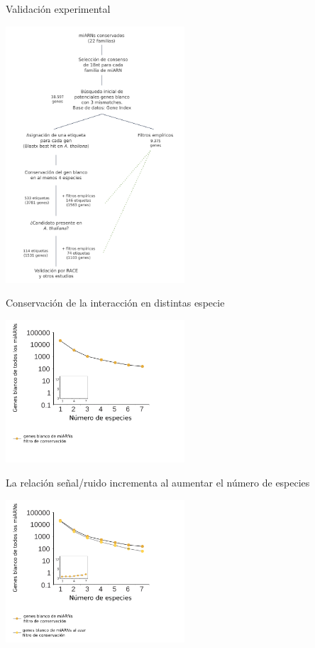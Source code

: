 \documentclass{beamer}
\begin{document}
\begin{frame}{Validación experimental}
	\begin{center}
		\includegraphics[width=0.5\textwidth]{img/NAR_fig1_07.png}
	\end{center}
\end{frame}

\begin{frame}{Conservación de la interacción en distintas especie}
	\begin{center}
		\includegraphics[width=0.5\textwidth]{img/NAR_fig2_01.png}
	\end{center}
\end{frame}

\begin{frame}{La relación señal/ruido incrementa al aumentar el número de especies}
	\begin{center}
		\includegraphics[width=0.5\textwidth]{img/NAR_fig2_02.png}
	\end{center}
\end{frame}
\end{document}
